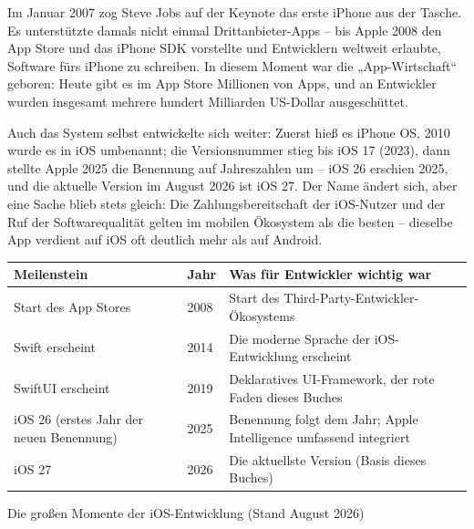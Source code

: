 


Im Januar 2007 zog Steve Jobs auf der Keynote das erste iPhone aus der Tasche. Es unterstützte damals nicht einmal Drittanbieter-Apps – bis Apple 2008 den App Store und das iPhone SDK vorstellte und Entwicklern weltweit erlaubte, Software fürs iPhone zu schreiben. In diesem Moment war die „App-Wirtschaft“ geboren: Heute gibt es im App Store Millionen von Apps, und an Entwickler wurden insgesamt mehrere hundert Milliarden US-Dollar ausgeschüttet.

Auch das System selbst entwickelte sich weiter: Zuerst hieß es iPhone OS, 2010 wurde es in iOS umbenannt; die Versionsnummer stieg bis iOS 17 (2023), dann stellte Apple 2025 die Benennung auf Jahreszahlen um – iOS 26 erschien 2025, und die aktuelle Version im August 2026 ist iOS 27. Der Name ändert sich, aber eine Sache blieb stets gleich: Die Zahlungsbereitschaft der iOS-Nutzer und der Ruf der Softwarequalität gelten im mobilen Ökosystem als die besten – dieselbe App verdient auf iOS oft deutlich mehr als auf Android.

\begin{center}
\begin{tabularx}{\linewidth}{|X|X|X|}
\hline
\textbf{Meilenstein} & \textbf{Jahr} & \textbf{Was für Entwickler wichtig war} \tabularnewline
\hline
Start des App Stores & 2008 & Start des Third-Party-Entwickler-Ökosystems \tabularnewline
Swift erscheint & 2014 & Die moderne Sprache der iOS-Entwicklung erscheint \tabularnewline
SwiftUI erscheint & 2019 & Deklaratives UI-Framework, der rote Faden dieses Buches \tabularnewline
iOS 26 (erstes Jahr der neuen Benennung) & 2025 & Benennung folgt dem Jahr; Apple Intelligence umfassend integriert \tabularnewline
iOS 27 & 2026 & Die aktuellste Version (Basis dieses Buches) \tabularnewline
\hline
\end{tabularx}
\end{center}

\begin{center}\small\color{gray}Die großen Momente der iOS-Entwicklung (Stand August 2026)\end{center}


